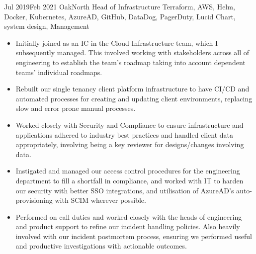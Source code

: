 \documentclass[10pt]{article} %
\begin{document}
\jobheader
{Jul 2019}{Feb 2021}
{OakNorth}
{Head of Infrastructure}
{
      Terraform,
      AWS,
      Helm,
      Docker,
      Kubernetes,
      AzureAD,
      GitHub,
      DataDog,
      PagerDuty,
      Lucid Chart,
      system design,
      Management
}
{
  \begin{itemize}
      \item Initially joined as an IC in the Cloud Infrastructure team, which I subsequently managed.
            This involved working with stakeholders across all of engineering to establish the team's
            roadmap taking into account dependent teams' individual roadmaps.

      \item Rebuilt our single tenancy client platform infrastructure to have CI/CD and automated processes
            for creating and updating client environments, replacing slow and error prone manual processes.

      \item Worked closely with Security and Compliance to ensure infrastructure and applications adhered
            to industry best practices and handled client data appropriately, involving being a key
            reviewer for designs/changes involving data.

      \item Instigated and managed our access control procedures for the engineering department
            to fill a shortfall in compliance, and worked with IT to harden our security
            with better SSO integrations, and utilisation of AzureAD's auto-provisioning
            with SCIM wherever possible.

      \item Performed on call duties and worked closely with the heads of engineering and product support
            to refine our incident handling policies. Also heavily involved with our incident postmortem
            process, ensuring we performed useful and productive investigations with actionable outcomes.

  \end{itemize}
}
\end{document}

